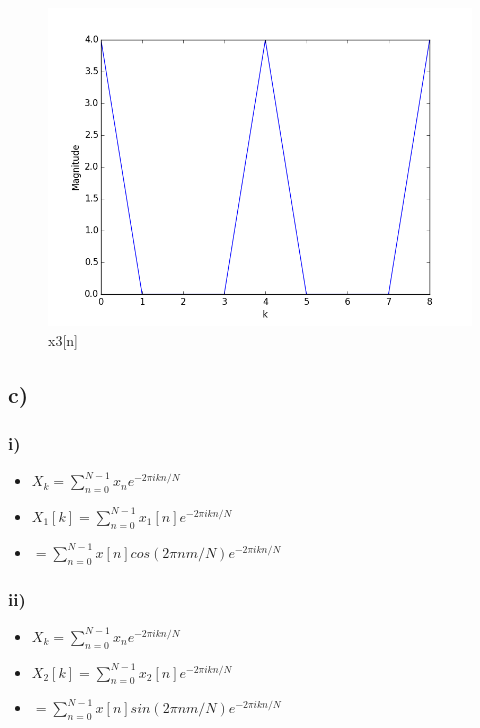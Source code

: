 \begin{figure}[H]
  \centering
  \includegraphics[width=\linewidth]{2b_3}
  \caption{x3[n]}
  \label{fig:2b3}
\end{figure}


\subsection*{c)}
\subsubsection*{i)}
\begin{itemize}[leftmargin=*]
  \item[] \(X_k = \displaystyle\sum_{n = 0}^{N - 1} x_n e^{-2 \pi i k n / N}\)
  \item[] \(X_1[k] = \displaystyle\sum_{n = 0}^{N - 1} x_1[n] e^{-2 \pi i k n / N}\)
  \item[] \(= \displaystyle\sum_{n = 0}^{N - 1} x[n] cos(2 \pi n m / N) e^{-2 \pi i k n / N}\)
\end{itemize}

\subsubsection*{ii)}
\begin{itemize}[leftmargin=*]
  \item[] \(X_k = \displaystyle\sum_{n = 0}^{N - 1} x_n e^{-2 \pi i k n / N}\)
  \item[] \(X_2[k] = \displaystyle\sum_{n = 0}^{N - 1} x_2[n] e^{-2 \pi i k n / N}\)
  \item[] \(= \displaystyle\sum_{n = 0}^{N - 1} x[n] sin(2 \pi n m / N) e^{-2 \pi i k n / N}\)
\end{itemize}

